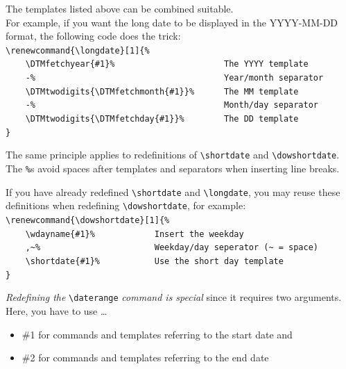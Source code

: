 \documentclass[11pt]{ltxdoc}
\begin{document}
	\bigskip
	The templates listed above can be combined suitable. \\
	For example, if you want the long date to be displayed in the \textsf{YYYY-MM-DD} format, the following code does the trick: \\
	\verb|\renewcommand{\longdate}[1]{%| \\\nopagebreak[4]
	\verb|    \DTMfetchyear{#1}%                      The YYYY template| \\\nopagebreak[4]
	\verb|    -%                                      Year/month separator| \\\nopagebreak[4]
	\verb|    \DTMtwodigits{\DTMfetchmonth{#1}}%      The MM template| \\\nopagebreak[4]
	\verb|    -%                                      Month/day separator| \\\nopagebreak[4]
	\verb|    \DTMtwodigits{\DTMfetchday{#1}}%        The DD template| \\\nopagebreak[4]
	\verb|}| \pagebreak[0]
	
	\medskip
	The same principle applies to redefinitions of \verb|\shortdate| and \verb|\dowshortdate|. \\
	The \verb|%|s avoid spaces after templates and separators when inserting line breaks.
	
	\medskip
	If you have already redefined \verb|\shortdate| and \verb|\longdate|, you may reuse these definitions when redefining \verb|\dowshortdate|, for example: \\
	\verb|\renewcommand{\dowshortdate}[1]{%| \\\nopagebreak[4]
	\verb|    \wdayname{#1}%            Insert the weekday| \\\nopagebreak[4]
	\verb|    ,~%                       Weekday/day seperator (~ = space)| \\\nopagebreak[4]
	\verb|    \shortdate{#1}%           Use the short day template| \\\nopagebreak[4]
	\verb|}| \pagebreak[0]
	
	\bigskip
	\textit{Redefining the} \verb|\daterange| \textit{command is special} since it requires two arguments. \\
	Here, you have to use \dots
	\begin{itemize}
		\item
		{\ttfamily\#1} for commands and templates referring to the start date and
		
		\item
		{\ttfamily\#2} for commands and templates referring to the end date
	\end{itemize}
	
\end{document}
